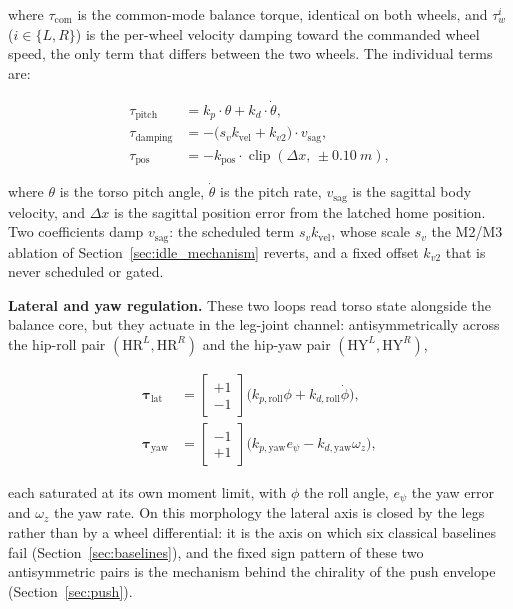 \documentclass[a4paper,fleqn]{cas-dc}
\begin{document}
where $\tau_{\text{com}}$ is the common-mode balance torque, identical on both wheels, and $\tau_{w}^{i}$ ($i\in\{L,R\}$) is the per-wheel velocity damping toward the commanded wheel speed, the only term that differs between the two wheels. The individual terms are:

\begin{align}
\tau_{\text{pitch}} &= k_p\cdot\theta + k_d\cdot\dot{\theta},\\
\tau_{\text{damping}} &= -\big(s_v k_{\text{vel}} + k_{v2}\big)\cdot v_{\text{sag}},\\
\tau_{\text{pos}} &= -k_{\text{pos}}\cdot\operatorname{clip}(\Delta x,\,\pm\SI{0.10}{m}),
\end{align}

where $\theta$ is the torso pitch angle, $\dot{\theta}$ is the pitch rate, $v_{\text{sag}}$ is the sagittal body velocity, and $\Delta x$ is the sagittal position error from the latched home position. Two coefficients damp $v_{\text{sag}}$: the scheduled term $s_v k_{\text{vel}}$, whose scale $s_v$ the M2/M3 ablation of Section~\ref{sec:idle_mechanism} reverts, and a fixed offset $k_{v2}$ that is never scheduled or gated.

\textbf{Lateral and yaw regulation.}
These two loops read torso state alongside the balance core, but they actuate in the leg-joint channel: antisymmetrically across the hip-roll pair $(\mathrm{HR}^L,\mathrm{HR}^R)$ and the hip-yaw pair $(\mathrm{HY}^L,\mathrm{HY}^R)$,

\begin{equation}
\begin{aligned}
\boldsymbol{\tau}_{\text{lat}} &=
\begin{bmatrix} +1 \\ -1 \end{bmatrix}
\big(k_{p,\text{roll}}\phi + k_{d,\text{roll}}\dot{\phi}\big),\\[2pt]
\boldsymbol{\tau}_{\text{yaw}} &=
\begin{bmatrix} -1 \\ +1 \end{bmatrix}
\big(k_{p,\text{yaw}}e_\psi - k_{d,\text{yaw}}\omega_z\big),
\end{aligned}
\label{eq:lat_yaw}
\end{equation}

each saturated at its own moment limit, with $\phi$ the roll angle, $e_\psi$ the yaw error and $\omega_z$ the yaw rate. On this morphology the lateral axis is closed by the legs rather than by a wheel differential: it is the axis on which six classical baselines fail (Section~\ref{sec:baselines}), and the fixed sign pattern of these two antisymmetric pairs is the mechanism behind the chirality of the push envelope (Section~\ref{sec:push}).
\end{document}

